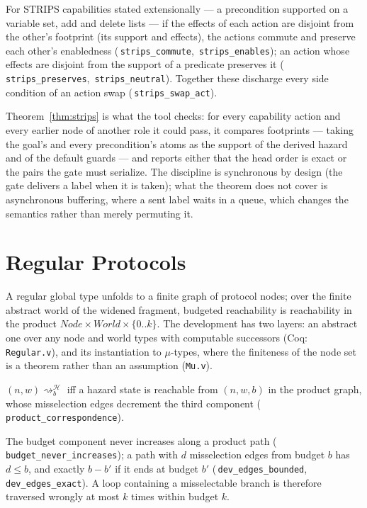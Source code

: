 \documentclass[a4paper,UKenglish,cleveref,autoref,thm-restate,anonymous]{lipics-v2021}
\newcommand{\Haz}{\mathcal H}
\newcommand{\reachh}[1]{\rightsquigarrow^{\Haz}_{#1}}
\newcommand{\coqok}[1]{\textcolor{okgreen}{\ding{51}}\,\texttt{\small #1}}
\begin{document}
\begin{theorem}\label{thm:strips}
For STRIPS capabilities stated extensionally --- a precondition supported on
a variable set, add and delete lists --- if the effects of each action are
disjoint from the other's footprint (its support and effects), the actions
commute and preserve each other's enabledness
(\coqok{strips\_commute}, \coqok{strips\_enables}); an action whose effects
are disjoint from the support of a predicate preserves it
(\coqok{strips\_preserves}, \coqok{strips\_neutral}). Together these
discharge every side condition of an action swap (\coqok{strips\_swap\_act}).
\end{theorem}

Theorem~\ref{thm:strips} is what the tool checks: for every capability action
and every earlier node of another role it could pass, it compares footprints
--- taking the goal's and every precondition's atoms as the support of the
derived hazard and of the default guards --- and reports either that the
head order is exact or the pairs the gate must serialize. The discipline is
synchronous by design (the gate delivers a label when it is taken); what the
theorem does not cover is asynchronous buffering, where a sent label waits in
a queue, which changes the semantics rather than merely permuting it.

\section{Regular Protocols}\label{sec:regular}

A regular global type unfolds to a finite graph of protocol nodes; over the
finite abstract world of the widened fragment, budgeted reachability is
reachability in the product $\mathit{Node}\times\mathit{World}\times\{0..k\}$.
The development has two layers: an abstract one over any node and world types
with computable successors (Coq: \texttt{Regular.v}), and its instantiation
to $\mu$-types, where the finiteness of the node set is a theorem rather than
an assumption (\texttt{Mu.v}).

\begin{theorem}[Product]\label{thm:product}
$(n,w)\reachh{b}$ iff a hazard state is reachable from $(n,w,b)$ in the product
graph, whose misselection edges decrement the third component
(\coqok{product\_correspondence}).
\end{theorem}

\begin{theorem}\label{thm:loop}
The budget component never increases along a product path
(\coqok{budget\_never\_increases}); a path with $d$ misselection edges from
budget $b$ has $d\le b$, and exactly $b-b'$ if it ends at budget $b'$
(\coqok{dev\_edges\_bounded}, \coqok{dev\_edges\_exact}). A loop containing a
misselectable branch is therefore traversed wrongly at most $k$ times within
budget $k$.
\end{theorem}
\end{document}
